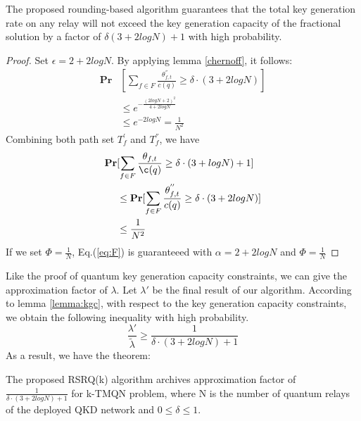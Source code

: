 {\begin{lemma}\label{lemma:kgc}
	The proposed rounding-based algorithm guarantees that the total key generation rate on any relay will not exceed the key generation capacity of the fractional solution by a factor of $\delta(3+2logN)+1$ with high probability.
	\begin{proof}
		Set $\epsilon = 2 + 2logN$. By applying lemma \ref{chernoff}, it follows:
		\begin{equation}
		\begin{aligned}
		\textbf{Pr}&[\sum_{f \in F} \frac{\theta^{''}_{f,t}}{c(q)} \ge  \delta \cdot (3+2logN)] \\
		& \le e^{-\frac{(2logN+2)^2}{4+2logN}} \\
		& \le  e^{-2logN} = \frac{1}{N^2} 
		\end{aligned}
		\end{equation}
		Combining both path set $T^{'}_f$ and $T^{''}_f$, we have 
		\begin{equation}
		\begin{aligned}
		\textbf{Pr}&[\sum_{f \in F} \frac{\theta_{f,t}}{\c(q)} \ge  \delta \cdot (3+logN) + 1] \\
		& \le \textbf{Pr}[\sum_{f \in F} \frac{\theta^{''}_{f,t}}{c(q)} \ge  \delta \cdot (3+2logN)] \\
		& \le \frac{1}{N^2} 
		\end{aligned}
		\end{equation}
		If we set $\Phi = \frac{1}{N}$, Eq.(\ref{eq:F}) is guaranteeed with $\alpha = 2 + 2logN$ and $\Phi = \frac{1}{N}$
	\end{proof}
\end{lemma}

Like the proof of quantum key generation capacity constraints, we can give the approximation factor of $\lambda$. Let $\lambda'$ be the final result of our algorithm. According to lemma \ref{lemma:kgc}, with respect to the key generation capacity constraints, we obtain the following inequality with high probability.
\begin{equation}
	\frac{\lambda'}{\widetilde{\lambda}} \ge \frac{1}{\delta \cdot (3+2logN)+1}
\end{equation}
As a result, we have the theorem:
\begin{theorem}
	The proposed RSRQ(k) algorithm archives approximation factor of $\frac{1}{\delta \cdot (3+2logN)+1}$ for k-TMQN problem, where N is the number of quantum relays of the deployed QKD network and $0 \le \delta \le 1$.
\end{theorem}


}
